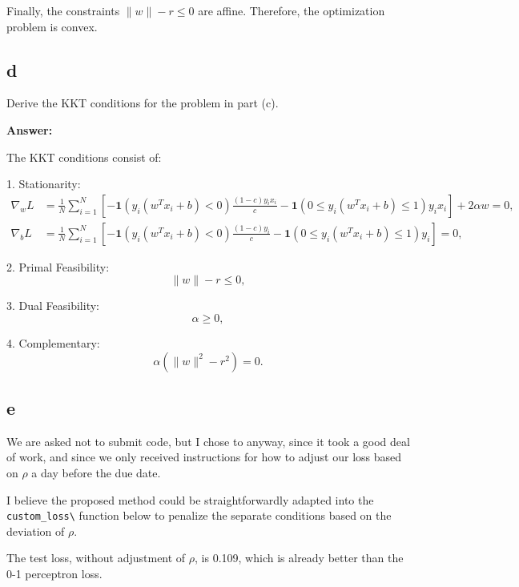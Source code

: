 \documentclass{article}
\begin{document}
Finally, the constraints \( \|w\| - r \leq 0\) are affine.
Therefore, the optimization problem is convex.

\subsection{d}
Derive the KKT conditions for the problem in part (c).

\textbf{Answer:}

The KKT conditions consist of:

1. Stationarity:
\[
\begin{aligned}
    \nabla_w L &= \frac{1}{N} \sum_{i=1}^{N} \left[ -\mathbf{1}(y_i (w^T x_i + b) < 0) \frac{(1-c)y_i x_i}{c} - \mathbf{1}(0 \leq y_i (w^T x_i + b) \leq 1) y_i x_i \right] + 2 \alpha w = 0, \\
    \nabla_b L &= \frac{1}{N} \sum_{i=1}^{N} \left[ -\mathbf{1}(y_i (w^T x_i + b) < 0) \frac{(1-c)y_i}{c} - \mathbf{1}(0 \leq y_i (w^T x_i + b) \leq 1) y_i \right] = 0,
\end{aligned}
\]

2. Primal Feasibility:
\[
\| w \|  - r \leq 0,
\]

3. Dual Feasibility:
\[
\alpha \geq 0,
\]

4. Complementary:
\[
\alpha (\| w \|^2 - r^2) = 0.
\]

\subsection{e}

We are asked not to submit code, but I chose to anyway, since it took a good deal of work, and since we only received instructions for how to adjust our loss based on $\rho$ a day before the due date.

I believe the proposed method could be straightforwardly adapted into the \verb|custom_loss\| function below to penalize the separate conditions based on the deviation of $\rho$.

The test loss, without adjustment of $\rho$, is 0.109, which is already better than the 0-1 perceptron loss.
\end{document}
